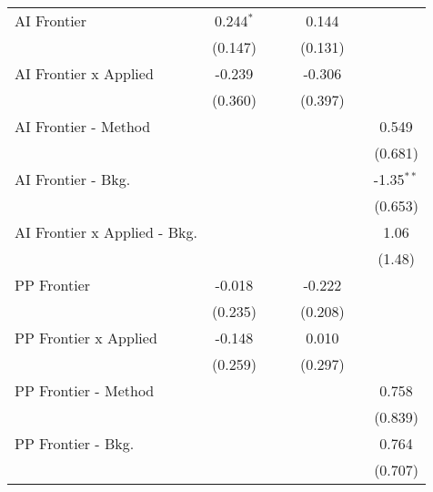 \begin{tabular}{lcccccc}
   AI Frontier                    & 0.244$^{*}$   &         &         & 0.144         &        &   \\   
                                  & (0.147)       &         &         & (0.131)       &        &   \\   
   AI Frontier x Applied          & -0.239        &         &         & -0.306        &        &   \\   
                                  & (0.360)       &         &         & (0.397)       &        &   \\   
   AI Frontier - Method           &               &         &         &               &        & 0.549\\   
                                  &               &         &         &               &        & (0.681)\\   
   AI Frontier - Bkg.             &               &         &         &               &        & -1.35$^{**}$\\   
                                  &               &         &         &               &        & (0.653)\\   
   AI Frontier x Applied - Bkg.   &               &         &         &               &        & 1.06\\   
                                  &               &         &         &               &        & (1.48)\\   
   PP Frontier                    & -0.018        &         &         & -0.222        &        &   \\   
                                  & (0.235)       &         &         & (0.208)       &        &   \\   
   PP Frontier x Applied          & -0.148        &         &         & 0.010         &        &   \\   
                                  & (0.259)       &         &         & (0.297)       &        &   \\   
   PP Frontier - Method           &               &         &         &               &        & 0.758\\   
                                  &               &         &         &               &        & (0.839)\\   
   PP Frontier - Bkg.             &               &         &         &               &        & 0.764\\   
                                  &               &         &         &               &        & (0.707)\\   

\end{tabular}
